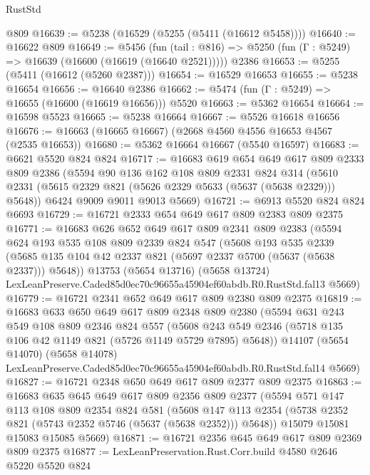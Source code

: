\begin{lexlean}{RustStd}
\begin{coremodule}
    @809
@16639 := @5238 (@16529 (@5255 (@5411 (@16612 @5458))))
@16640 := @16622 @809
@16649 := @5456
    (fun (tail : @816) => @5250 (fun (Γ : @5249) => @16639 (@16600 (@16619 (@16640 @2521)))))
    @2386
@16653 := @5255 (@5411 (@16612 (@5260 @2387)))
@16654 := @16529 @16653
@16655 := @5238 @16654
@16656 := @16640 @2386
@16662 := @5474 (fun (Γ : @5249) => @16655 (@16600 (@16619 @16656))) @5520
@16663 := @5362 @16654
@16664 := @16598 @5523
@16665 := @5238 @16664
@16667 := @5526 @16618 @16656
@16676 := @16663 (@16665 @16667) (@2668 @4560 @4556 @16653 @4567 (@2535 @16653))
@16680 := @5362 @16664 @16667 (@5540 @16597)
@16683 := @6621 @5520 @824 @824
@16717 := @16683
    @619
    @654
    @649
    @617
    @809
    @2333
    @809
    @2386
    (@5594
      @90
      @136
      @162
      @108
      @809
      @2331
      @824
      @314
      (@5610 @2331 (@5615 @2329 @821 (@5626 @2329 @5633 (@5637 (@5638 @2329))) @5648))
      @6424
      @9009
      @9011
      @9013
      @5669)
@16721 := @6913 @5520 @824 @824 @6693
@16729 := @16721 @2333 @654 @649 @617 @809 @2383 @809 @2375
@16771 := @16683
    @626
    @652
    @649
    @617
    @809
    @2341
    @809
    @2383
    (@5594
      @624
      @193
      @535
      @108
      @809
      @2339
      @824
      @547
      (@5608
        @193
        @535
        @2339
        (@5685 @135 @104 @42 @2337 @821 (@5697 @2337 @5700 (@5637 (@5638 @2337))) @5648))
      @13753
      (@5654 @13716)
      (@5658 @13724)
      LexLeanPreserve.Caded85d0ec70c96655a45904ef60abdb.R0.RustStd.fal13
      @5669)
@16779 := @16721 @2341 @652 @649 @617 @809 @2380 @809 @2375
@16819 := @16683
    @633
    @650
    @649
    @617
    @809
    @2348
    @809
    @2380
    (@5594
      @631
      @243
      @549
      @108
      @809
      @2346
      @824
      @557
      (@5608 @243 @549 @2346 (@5718 @135 @106 @42 @1149 @821 (@5726 @1149 @5729 @7895) @5648))
      @14107
      (@5654 @14070)
      (@5658 @14078)
      LexLeanPreserve.Caded85d0ec70c96655a45904ef60abdb.R0.RustStd.fal14
      @5669)
@16827 := @16721 @2348 @650 @649 @617 @809 @2377 @809 @2375
@16863 := @16683
    @635
    @645
    @649
    @617
    @809
    @2356
    @809
    @2377
    (@5594
      @571
      @147
      @113
      @108
      @809
      @2354
      @824
      @581
      (@5608 @147 @113 @2354 (@5738 @2352 @821 (@5743 @2352 @5746 (@5637 (@5638 @2352))) @5648))
      @15079
      @15081
      @15083
      @15085
      @5669)
@16871 := @16721 @2356 @645 @649 @617 @809 @2369 @809 @2375
@16877 := LexLeanPreservation.Rust.Corr.build @4580 @2646 @5220 @5520 @824

\end{coremodule}
\end{lexlean}
